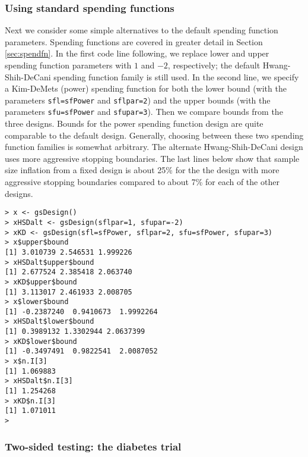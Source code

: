 \subsubsection{Using standard spending functions}
Next we consider some simple alternatives to the default spending function parameters.
Spending functions are covered in greater detail in Section \ref{sec:spendfn}. 
In the first code line following, we replace lower and upper spending function parameters with $1$ and $-2$, respectively; the default Hwang-Shih-DeCani spending function family is still used. 
In the second line, we specify a Kim-DeMets (power) spending function for
both the lower bound (with the parameters \texttt{sfl=sfPower} and \texttt{sflpar=2}) and the upper bounds (with the parameters \texttt{sfu=sfPower} and \texttt{sfupar=3}).
Then we compare bounds from the three designs. 
Bounds for the power spending function design are quite comparable to the default design. Generally, choosing between these two spending function families is somewhat arbitrary. The alternate Hwang-Shih-DeCani design uses more aggressive stopping boundaries. The last lines below show that sample size inflation from a fixed design is about 25\% for the the design with more aggressive stopping boundaries compared to about 7\% for each of the other designs. 

\bigskip

\begin{verbatim}
> x <- gsDesign()
> xHSDalt <- gsDesign(sflpar=1, sfupar=-2)
> xKD <- gsDesign(sfl=sfPower, sflpar=2, sfu=sfPower, sfupar=3)
> x$upper$bound
[1] 3.010739 2.546531 1.999226
> xHSDalt$upper$bound
[1] 2.677524 2.385418 2.063740
> xKD$upper$bound
[1] 3.113017 2.461933 2.008705
> x$lower$bound
[1] -0.2387240  0.9410673  1.9992264
> xHSDalt$lower$bound
[1] 0.3989132 1.3302944 2.0637399
> xKD$lower$bound
[1] -0.3497491  0.9822541  2.0087052
> x$n.I[3]
[1] 1.069883
> xHSDalt$n.I[3]
[1] 1.254268
> xKD$n.I[3]
[1] 1.071011
>\end{verbatim}

\subsubsection{Two-sided testing: the diabetes trial}
